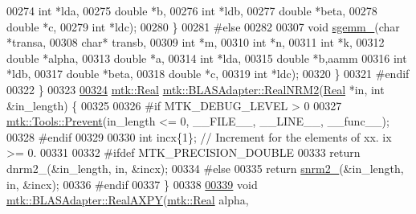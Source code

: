 \begin{DoxyCode}
00274             \textcolor{keywordtype}{int} *lda,
00275             \textcolor{keywordtype}{double} *b,
00276             \textcolor{keywordtype}{int} *ldb,
00277             \textcolor{keywordtype}{double} *beta,
00278             \textcolor{keywordtype}{double} *c,
00279             \textcolor{keywordtype}{int} *ldc);
00280 \}
00281 \textcolor{preprocessor}{#else}
00282 
00307 \textcolor{keywordtype}{void} \hyperlink{namespacemtk_adb7c0560326b8e57f255e58b87ec76b0}{sgemm\_}(\textcolor{keywordtype}{char} *transa,
00308             \textcolor{keywordtype}{char}* transb,
00309             \textcolor{keywordtype}{int} *m,
00310             \textcolor{keywordtype}{int} *n,
00311             \textcolor{keywordtype}{int} *k,
00312             \textcolor{keywordtype}{double} *alpha,
00313             \textcolor{keywordtype}{double} *a,
00314             \textcolor{keywordtype}{int} *lda,
00315             \textcolor{keywordtype}{double} *b,aamm
00316             \textcolor{keywordtype}{int} *ldb,
00317             \textcolor{keywordtype}{double} *beta,
00318             \textcolor{keywordtype}{double} *c,
00319             \textcolor{keywordtype}{int} *ldc);
00320 \}
00321 \textcolor{preprocessor}{#endif}
00322 \}
00323 
\hypertarget{mtk__blas__adapter_8cc_source_l00324}{}\hyperlink{classmtk_1_1BLASAdapter_ab92440888b730863244c5d9479c11aca}{00324} \hyperlink{group__c01-roots_gac080bbbf5cbb5502c9f00405f894857d}{mtk::Real} \hyperlink{classmtk_1_1BLASAdapter_ab92440888b730863244c5d9479c11aca}{mtk::BLASAdapter::RealNRM2}(\hyperlink{group__c01-roots_gac080bbbf5cbb5502c9f00405f894857d}{Real} *in, \textcolor{keywordtype}{int} &in\_length) \{
00325 
00326 \textcolor{preprocessor}{  #if MTK\_DEBUG\_LEVEL > 0}
00327   \hyperlink{classmtk_1_1Tools_a332324c6f25e66be9dff48c5987a3b9f}{mtk::Tools::Prevent}(in\_length <= 0, \_\_FILE\_\_, \_\_LINE\_\_, \_\_func\_\_);
00328 \textcolor{preprocessor}{  #endif}
00329 
00330   \textcolor{keywordtype}{int} incx\{1\};  \textcolor{comment}{// Increment for the elements of xx. ix >= 0.}
00331 
00332 \textcolor{preprocessor}{  #ifdef MTK\_PRECISION\_DOUBLE}
00333   \textcolor{keywordflow}{return} dnrm2\_(&in\_length, in, &incx);
00334 \textcolor{preprocessor}{  #else}
00335   \textcolor{keywordflow}{return} \hyperlink{namespacemtk_a508e99fcb14d526bc43aa0a80aa4b658}{snrm2\_}(&in\_length, in, &incx);
00336 \textcolor{preprocessor}{  #endif}
00337 \}
00338 
\hypertarget{mtk__blas__adapter_8cc_source_l00339}{}\hyperlink{classmtk_1_1BLASAdapter_a081cd092ae65e730f44eae8643edd539}{00339} \textcolor{keywordtype}{void} \hyperlink{classmtk_1_1BLASAdapter_a081cd092ae65e730f44eae8643edd539}{mtk::BLASAdapter::RealAXPY}(\hyperlink{group__c01-roots_gac080bbbf5cbb5502c9f00405f894857d}{mtk::Real} alpha,

\end{DoxyCode}
